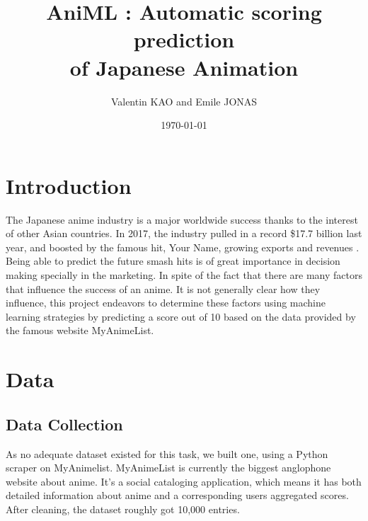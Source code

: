 \documentclass[final]{beamer}
\title
[Final Presentation for ML Course, June 2018, Beijing]
{ %
AniML : Automatic scoring prediction \\
of Japanese Animation
}
\author{
Valentin KAO and Emile JONAS
}
\institute{Department of Computer Sciences\\
Tsinghua University\\
}
\date{\today}
\begin{document}
\begin{frame}[t]
\begin{multicols}{3}

\section{Introduction}
The Japanese anime industry is a major worldwide success thanks to the interest of other Asian countries. In 2017, the industry pulled in a record \$17.7 billion last year, and boosted by the famous hit, Your Name, growing exports and revenues \cite{web1}. \\
Being able to predict the future smash hits is of great importance in decision making specially in the marketing. In spite of the fact that there are many factors that influence the success of an anime. It is not generally clear how they influence, this project endeavors to determine these factors using machine learning strategies by predicting a score out of 10 based on the data provided by the famous website MyAnimeList. \\




\section{Data}

\subsection{Data Collection}
As no adequate dataset existed for this task, we built one, using a Python scraper on MyAnimelist. MyAnimeList is currently the biggest anglophone website about anime. It's a social cataloging application, which means it has both detailed information about anime and a corresponding users aggregated scores. After cleaning, the dataset roughly got 10,000 entries.



\end{multicols}
\end{frame}
\end{document}
